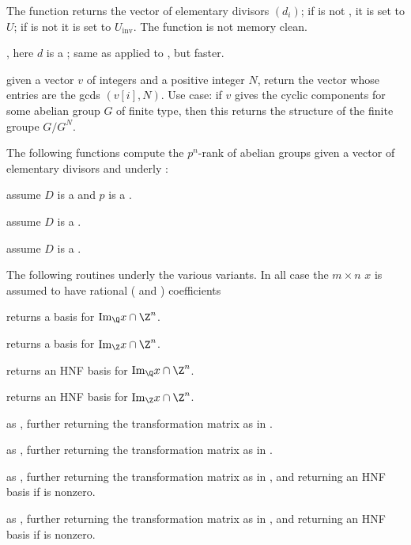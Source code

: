 The function returns the vector of elementary divisors $(d_i)$; if  is
not , it is set to $U$; if  is not  it is
set to $U_{\text{inv}}$. The function is not memory clean.

, here $d$ is a
; same as  applied to , but faster.

 given a vector $v$ of integers and a
positive integer $N$, return the vector whose entries are the gcds
$(v[i],N)$. Use case: if $v$ gives the cyclic components for some abelian
group $G$ of finite type, then this returns the structure of the finite
groupe $G/G^N$.

The following functions compute the $p^n$-rank of abelian groups given a
vector of elementary divisors and underly :

 assume $D$ is a  and $p$ is a
.

 assume $D$ is a .

 assume $D$ is a .

The following routines underly the various  variants.
In all case the $m\times n$  $x$ is assumed to have rational
( and ) coefficients

 returns a basis for
$\text{Im}_\Q x \cap \Z^n$.

 returns a basis for
$\text{Im}_\Z x \cap \Z^n$.

 returns an HNF basis for
$\text{Im}_\Q x \cap \Z^n$.

 returns an HNF basis for
$\text{Im}_\Z x \cap \Z^n$.

 as ,
further returning the transformation matrix as in .

 as ,
further returning the transformation matrix as in .

 as ,
further returning the transformation matrix as in , and
returning an HNF basis if  is nonzero.

 as ,
further returning the transformation matrix as in , and
returning an HNF basis if  is nonzero.

